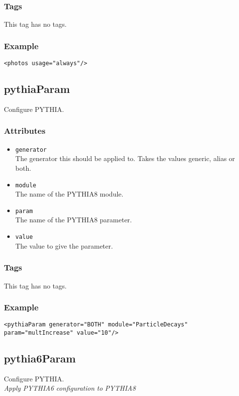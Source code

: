 \subsubsection*{Tags}
This tag has no tags.
\subsubsection*{Example}
{\footnotesize
\begin{verbatim}
<photos usage="always"/>
\end{verbatim}
}

\subsection{pythiaParam}
Configure PYTHIA.
\subsubsection*{Attributes}
\begin{itemize}
\item{\tt generator}\\
      The generator this should be applied to. Takes the values generic, alias or both.
\item{\tt module}\\
      The name of the PYTHIA8 module.
\item{\tt param}\\
      The name of the PYTHIA8 parameter.
\item{\tt value}\\
      The value to give the parameter.
\end{itemize}
\subsubsection*{Tags}
This tag has no tags.
\subsubsection*{Example}
{\footnotesize
\begin{verbatim}
<pythiaParam generator="BOTH" module="ParticleDecays" param="multIncrease" value="10"/>
\end{verbatim}
}

\subsection{pythia6Param}
Configure PYTHIA.\\
\emph{Apply PYTHIA6 configuration to PYTHIA8}
